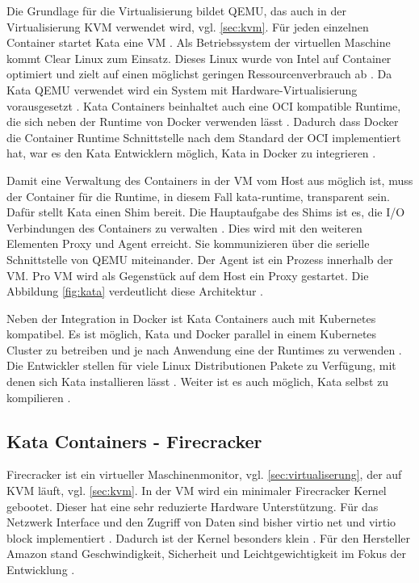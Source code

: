 Die Grundlage für die Virtualisierung bildet \ac{QEMU}, das auch in der Virtualisierung \ac{KVM} verwendet wird, vgl. \ref{sec:kvm}. Für jeden einzelnen Container startet Kata eine \ac{VM} \cite[vgl.][107]{UdoSeidel.2018}. Als Betriebssystem der virtuellen Maschine kommt Clear Linux zum Einsatz. Dieses Linux wurde von Intel auf Container optimiert und zielt auf einen möglichst geringen Ressourcenverbrauch ab  \cite[vgl.][107]{UdoSeidel.2018}. Da Kata \ac{QEMU} verwendet wird ein System mit Hardware-Virtualisierung vorausgesetzt  \cite[vgl.][108]{UdoSeidel.2018}.
Kata Containers beinhaltet auch eine \ac{OCI} kompatible Runtime, die sich neben der Runtime von Docker verwenden lässt \cite[vgl.][107]{UdoSeidel.2018}. Dadurch dass Docker die Container Runtime Schnittstelle nach dem Standard der \ac{OCI} implementiert hat, war es den Kata Entwicklern möglich, Kata in Docker zu integrieren \cite[vgl.][28]{TamHanna.01.11.2019}.
 
Damit eine Verwaltung des Containers in der \ac{VM} vom Host aus möglich ist, muss der Container für die Runtime, in diesem Fall kata-runtime, transparent sein. Dafür stellt Kata einen Shim bereit. Die Hauptaufgabe des Shims ist es, die I/O Verbindungen des Containers zu verwalten \cite[vgl.][]{katacontainers.20191207}. Dies wird mit den weiteren Elementen Proxy und Agent erreicht. Sie kommunizieren über die serielle Schnittstelle von \ac{QEMU} miteinander. Der Agent ist ein Prozess innerhalb der \ac{VM}. Pro \ac{VM} wird als Gegenstück auf dem Host ein Proxy gestartet. Die Abbildung \ref{fig:kata} verdeutlicht diese Architektur \cite[vgl.][107]{UdoSeidel.2018}.

Neben der Integration in Docker ist Kata Containers auch mit Kubernetes kompatibel. Es ist möglich, Kata und Docker parallel in einem Kubernetes Cluster zu betreiben und je nach Anwendung eine der Runtimes zu verwenden  \cite[vgl.][]{katacontainers.20191207}.
Die Entwickler stellen für viele Linux Distributionen Pakete zu Verfügung, mit denen sich Kata installieren lässt \cite[vgl.][]{katacontainers.20200120}. Weiter ist es auch möglich, Kata selbst zu kompilieren \cite[vgl.][108]{UdoSeidel.2018}.

\subsection{Kata Containers - Firecracker}
\label{sec:katafc}
Firecracker ist ein virtueller Maschinenmonitor, vgl. \ref{sec:virtualiserung}, der auf \ac{KVM} läuft, vgl. \ref{sec:kvm}. 
In der \ac{VM} wird ein minimaler Firecracker Kernel gebootet. Dieser hat eine sehr reduzierte Hardware Unterstützung. Für das Netzwerk Interface und den Zugriff von Daten sind bisher virtio net und virtio block implementiert \cite[vgl.][]{ArunGupta.2018}. Dadurch ist der Kernel besonders klein \cite[vgl.][11]{Randal.28.04.2019}. Für den Hersteller Amazon stand Geschwindigkeit, Sicherheit und Leichtgewichtigkeit im Fokus der Entwicklung \cite[vgl.][]{ArunGupta.2018}.

